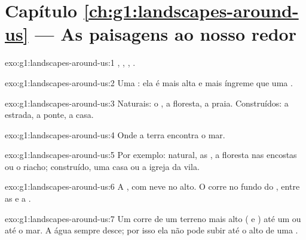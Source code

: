 \section*{Capítulo \ref{ch:g1:landscapes-around-us} --- As paisagens ao nosso redor}

\begin{solution}{exo:g1:landscapes-around-us:1}
, , , .
\end{solution}

\begin{solution}{exo:g1:landscapes-around-us:2}
Uma : ela é mais alta e mais íngreme que uma .
\end{solution}

\begin{solution}{exo:g1:landscapes-around-us:3}
Naturais: o , a floresta, a praia. Construídos: a estrada, a ponte, a
casa.
\end{solution}

\begin{solution}{exo:g1:landscapes-around-us:4}
Onde a terra encontra o mar.
\end{solution}

\begin{solution}{exo:g1:landscapes-around-us:5}
Por exemplo: natural, as , a floresta nas encostas ou o riacho;
construído, uma casa ou a igreja da vila.
\end{solution}

\begin{solution}{exo:g1:landscapes-around-us:6}
A , com neve no alto. O  corre no fundo do , entre as
 e a .
\end{solution}

\begin{solution}{exo:g1:landscapes-around-us:7}
Um  corre de um terreno mais alto ( e ) até um  ou
até o mar. A água sempre desce; por isso ela não pode subir até o alto
de uma .
\end{solution}

